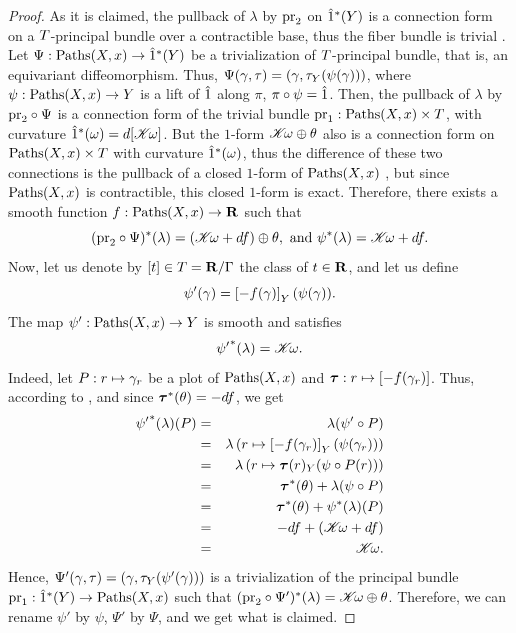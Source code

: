 \begin{proof}
  As it is claimed,
  the pullback of $\lambda$ by $\pr_2$ on $\1^*(\Y)$ is a connection form on a $\Torus$-principal bundle over a contractible base,
  thus the fiber bundle is trivial .
  Let $\Psi : \Paths(\X,x) \to \1^*(\Y)$ be a trivialization of $\Torus$-principal bundle,
  that is,
  an equivariant diffeomorphism.
  Thus,
  $\Psi(\gamma,\tau) = (\gamma, \tau_\Y(\psi(\gamma)))$,
  where $\psi : \Paths(\X,x) \to \Y$ is a lift of $\1$ along $\pi$,
  $\pi \circ \psi = \1$.
  Then,
  the pullback of $\lambda$ by $\pr_2 \circ \Psi$ is a connection form of the trivial bundle $\pr_1 : \Paths(\X,x) \times \Torus$,
  with curvature $\1^*(\omega) = d[\CHK\!\omega]$.
  But the $1$-form $\CHK\!\omega \oplus \theta$ also is a connection form on $\Paths(\X,x) \times \Torus$ with curvature $\1^*(\omega)$,
  thus the difference of these two connections is the pullback of a closed $1$-form of $\Paths(\X,x)$ ,
  but since $\Paths(\X,x)$ is contractible,
  this closed $1$-form is exact.
  Therefore,
  there exists a smooth function $f : \Paths(\X,x) \to \RR$ such that
  $$%
  (\pr_2 \circ \Psi)^*(\lambda) = (\CHK\!\omega + df) \oplus \theta, \text{ and } \psi^*(\lambda) = \CHK\!\omega + df.
  $$%
  Now,
  let us denote by $\cl{t} \in \Torus = \RR/\Gamma$ the class of $t \in \RR$,
  and let us define
  $$%
  \psi'(\gamma) = \cl{-f(\gamma)}_\Y(\psi(\gamma)).
  $$%
  The map $\psi' : \Paths(\X,x) \to \Y$ is smooth and satisfies
  $$%
  {\psi'}^*(\lambda) = \CHK\!\omega.
  $$%
  Indeed,
  let $\P : r \mapsto \gamma_r$ be a plot of $\Paths(\X,x)$ and $\btau : r \mapsto \cl{-f(\gamma_r)}$.
  Thus,
  according to ,
  and since $\btau^*(\theta) = - df$,
  we get
  \begin{eqnarray*}
    {\psi'}^*(\lambda)(\P) & = & \lambda( \psi' \circ \P) \\
    & = & \lambda\left(r \mapsto \cl{-f(\gamma_r)}_\Y(\psi(\gamma_r))\right) \\
    & = & \lambda\left(r \mapsto \btau(r)_\Y(\psi \circ \P(r))\right)\\
    & = & \btau^*(\theta) + \lambda(\psi \circ \P) \\
    & = & \btau^*(\theta) + \psi^*(\lambda)(\P) \\
    & = & -df + (\CHK\!\omega + df) \\
    & = & \CHK\!\omega.
  \end{eqnarray*}
  Hence,
  $\Psi'(\gamma, \tau) = (\gamma, \tau_\Y(\psi'(\gamma)))$ is a trivialization of the principal bundle%
  \linebreak
  $\pr_1 : \1^*(\Y) \to \Paths(\X,x)$ such that $(\pr_2 \circ \Psi')^*(\lambda) = \CHK\!\omega \oplus \theta$.
  Therefore,
  we can rename $\psi'$ by $\psi$,
  $\Psi'$ by $\Psi$,
  and we get what is claimed.
  

\end{proof}

